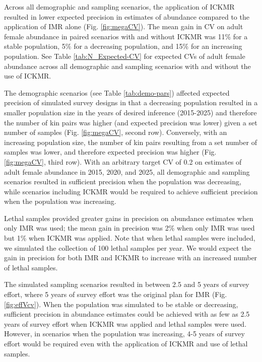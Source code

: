 Across all demographic and sampling scenarios, the application of
ICKMR resulted in lower expected precision in estimates of abundance
compared to the application of IMR alone (Fig. \ref{fig:megaCV}).
The mean gain in CV on adult female abundance in paired scenarios
with and without ICKMR was 11\% for a stable population, 5\% for a
decreasing population, and 15\% for an increasing population. See
Table \ref{tab:N_Expected-CV} for expected CVs of adult female abundance
across all demographic and sampling scenarios with and without the
use of ICKMR.

The demographic scenarios (see Table \ref{tab:demo-pars}) affected
expected precision of simulated survey designs in that a decreasing
population resulted in a smaller population size in the years of desired
inference (2015-2025) and therefore the number of kin pairs was higher
(and expected precision was lower) given a set number of samples (Fig.
\ref{fig:megaCV}, second row). Conversely, with an increasing population
size, the number of kin pairs resulting from a set number of samples
was lower, and therefore expected precision was higher (Fig. \ref{fig:megaCV},
third row). With an arbitrary target CV of 0.2 on estimates of adult
female abundance in 2015, 2020, and 2025, all demographic and sampling
scenarios resulted in sufficient precision when the population was
decreasing, while scenarios including ICKMR would be required to achieve
sufficient precision when the population was increasing. 

Lethal samples provided greater gains in precision on abundance estimates
when only IMR was used; the mean gain in precision was 2\% when only
IMR was used but 1\% when ICKMR was applied. Note that when lethal
samples were included, we simulated the collection of 100 lethal samples
per year. We would expect the gain in precision for both IMR and ICKMR
to increase with an increased number of lethal samples. 

The simulated sampling scenarios resulted in between 2.5 and 5 years
of survey effort, where 5 years of survey effort was the original
plan for IMR (Fig. \ref{fig:effVcv}). When the population was simulated
to be stable or decreasing, sufficient precision in abundance estimates
could be achieved with as few as 2.5 years of survey effort when ICKMR
was applied and lethal samples were used. However, in scenarios when
the population was increasing, 4-5 years of survey effort would be
required even with the application of ICKMR and use of lethal samples. 


